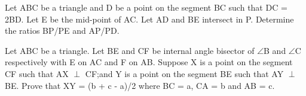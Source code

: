 \item Let ABC be a triangle and D be a point on the segment BC such that DC = 2BD. Let E be the mid-point of AC. Let AD and BE intersect in P. Determine the ratios BP/PE and AP/PD.

\item Let ABC be a triangle. Let BE and CF be internal angle bisector of $\angle$B and $\angle$C respectively with E on AC and F on AB. Suppose X is a point on the segment CF such that AX $\perp$ CF;and Y is a point on the segment BE such that AY $\perp$ BE. Prove that XY = (b + c - a)/2 where BC = a, CA = b and AB = c.

